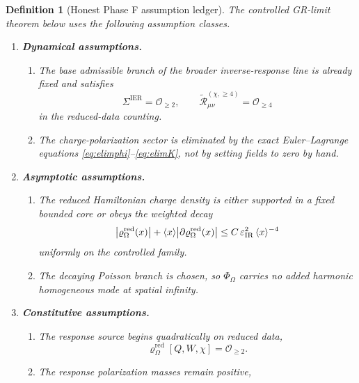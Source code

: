 \documentclass[11pt]{article}
\newcommand{\BaseShift}{\Sigma^{\mathrm{IER}}}
\newcommand{\FlowPot}{\Phi_\Omega}
\newcommand{\SourceDensityRed}{\varrho_\Omega^{\mathrm{red}}}
\newcommand{\RemLongFour}{\widetilde{\mathcal R}_{\mu\nu}^{(\chi,\ge 4)}}
\newcommand{\Weight}[1]{\langle #1 \rangle}
\newcommand{\IRsmall}{\varepsilon_{\mathrm{IR}}}
\newtheorem{definition}{Definition}
\begin{document}
\begin{definition}[Honest Phase F assumption ledger]
\label{def:ledger}
The controlled GR-limit theorem below uses the following assumption classes.
\begin{enumerate}
    \item \textbf{Dynamical assumptions.}
    \begin{enumerate}
        \item[(D1)] The base admissible branch of the broader inverse-response line is already fixed and satisfies
        \begin{equation}
        \BaseShift=\mathcal O_{\ge 2},
        \qquad
        \RemLongFour=\mathcal O_{\ge 4}
        \label{eq:d1}
        \end{equation}
        in the reduced-data counting.
        \item[(D2)] The charge-polarization sector is eliminated by the exact Euler--Lagrange equations \eqref{eq:elimphi}--\eqref{eq:elimK}, not by setting fields to zero by hand.
    \end{enumerate}
    \item \textbf{Asymptotic assumptions.}
    \begin{enumerate}
        \item[(A1)] The reduced Hamiltonian charge density is either supported in a fixed bounded core or obeys the weighted decay
        \begin{equation}
        \abs{\SourceDensityRed(x)}
        +\Weight{x}\abs{\partial\SourceDensityRed(x)}
        \le C\,\IRsmall^2\,\Weight{x}^{-4}
        \label{eq:a1}
        \end{equation}
        uniformly on the controlled family.
        \item[(A2)] The decaying Poisson branch is chosen, so \(\FlowPot\) carries no added harmonic homogeneous mode at spatial infinity.
    \end{enumerate}
    \item \textbf{Constitutive assumptions.}
    \begin{enumerate}
        \item[(C1)] The response source begins quadratically on reduced data,
        \begin{equation}
        \SourceDensityRed[Q,W,\chi]=\mathcal O_{\ge 2}.
        \label{eq:c1}
        \end{equation}
        \item[(C2)] The response polarization masses remain positive,
        \begin{equation}

\end{equation}
\end{enumerate}
\end{enumerate}
\end{definition}
\end{document}
